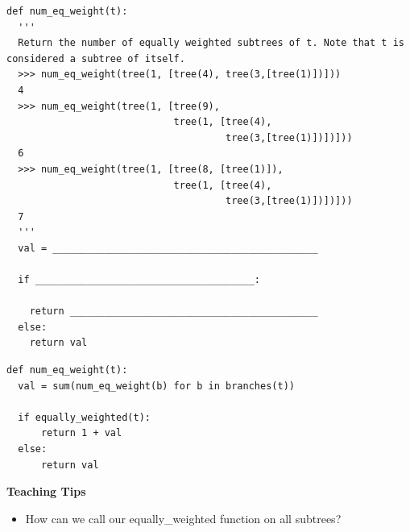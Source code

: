 \begin{parts}
\begin{lstlisting}
def num_eq_weight(t):
  '''
  Return the number of equally weighted subtrees of t. Note that t is considered a subtree of itself.
  >>> num_eq_weight(tree(1, [tree(4), tree(3,[tree(1)])]))
  4
  >>> num_eq_weight(tree(1, [tree(9), 
                             tree(1, [tree(4), 
                                      tree(3,[tree(1)])])]))
  6
  >>> num_eq_weight(tree(1, [tree(8, [tree(1)]), 
                             tree(1, [tree(4), 
                                      tree(3,[tree(1)])])]))
  7
  '''
  val = ______________________________________________

  if ______________________________________:

    return ___________________________________________
  else:
    return val
\end{lstlisting}

\begin{solution}
\begin{lstlisting}
def num_eq_weight(t):
  val = sum(num_eq_weight(b) for b in branches(t))

  if equally_weighted(t):
      return 1 + val
  else:
      return val
\end{lstlisting}
\end{solution}
\begin{guide}
\textbf{Teaching Tips}
  \begin{itemize}
    \item How can we call our equally\_weighted function on all subtrees?
  \end{itemize}
\end{guide}
\end{parts}